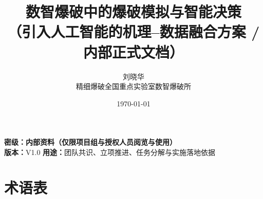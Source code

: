 \documentclass[12pt,a4paper,fontset=mac]{ctexart}
\title{\bfseries\LARGE 数智爆破中的爆破模拟与智能决策\\
\Large（引入人工智能的机理--数据融合方案 / 内部正式文档）}
\author{\large 刘晓华\\ \normalsize 精细爆破全国重点实验室\quad 数智爆破所}
\date{\large \today}
\begin{document}
\maketitle

\vspace{-0.4em}
\noindent\textbf{密级：内部资料（仅限项目组与授权人员阅览与使用）}\\
\noindent\textbf{版本：}V1.0 \quad \textbf{用途：}团队共识、立项推进、任务分解与实施落地依据

\vspace{0.8em}
\tableofcontents
\newpage

\section*{术语表}

\setlength{\tabcolsep}{6pt}
\renewcommand{\arraystretch}{1.25}
\small
\end{document}
